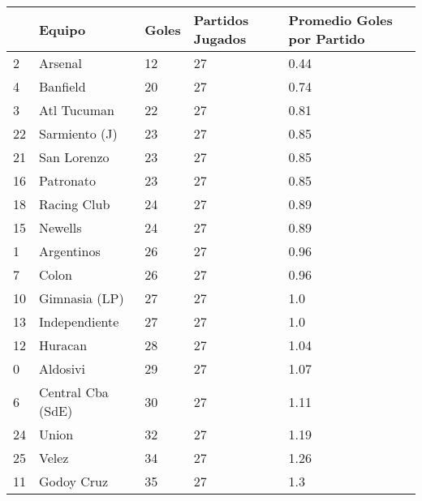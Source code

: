 \begin{table}[h]
\centering
\begin{tabular}{|l|l|l|l|l|}
\hline
   & \textbf{Equipo}            & \textbf{Goles} & \textbf{Partidos Jugados} & \textbf{Promedio Goles por Partido} \\ \hline
2  & Arsenal           & 12    & 27               & 0.44                       \\ \hline
4  & Banfield          & 20    & 27               & 0.74                       \\ \hline
3  & Atl Tucuman       & 22    & 27               & 0.81                       \\ \hline
22 & Sarmiento (J)     & 23    & 27               & 0.85                       \\ \hline
21 & San Lorenzo       & 23    & 27               & 0.85                       \\ \hline
16 & Patronato         & 23    & 27               & 0.85                       \\ \hline
18 & Racing Club       & 24    & 27               & 0.89                       \\ \hline
15 & Newells           & 24    & 27               & 0.89                       \\ \hline
1  & Argentinos        & 26    & 27               & 0.96                       \\ \hline
7  & Colon             & 26    & 27               & 0.96                       \\ \hline
10 & Gimnasia (LP)     & 27    & 27               & 1.0                        \\ \hline
13 & Independiente     & 27    & 27               & 1.0                        \\ \hline
12 & Huracan           & 28    & 27               & 1.04                       \\ \hline
0  & Aldosivi          & 29    & 27               & 1.07                       \\ \hline
6  & Central Cba (SdE) & 30    & 27               & 1.11                       \\ \hline
24 & Union             & 32    & 27               & 1.19                       \\ \hline
25 & Velez             & 34    & 27               & 1.26                       \\ \hline
11 & Godoy Cruz        & 35    & 27               & 1.3                        \\ \hline

\end{tabular}
\end{table}
